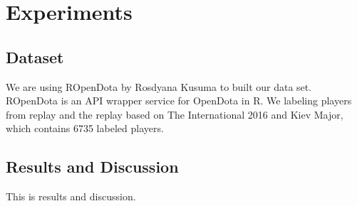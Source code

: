 \section{Experiments}
\label{sec:exp}

\subsection{Dataset}
\label{sec:dataset}

We are using ROpenDota by Rosdyana Kusuma to built our data set. ROpenDota is an API wrapper service for OpenDota in R. We labeling players from replay and the replay based on The International 2016 and Kiev Major, which contains 6735 labeled players.

\subsection{Results and Discussion}
\label{subsec:results}

This is results and discussion.
